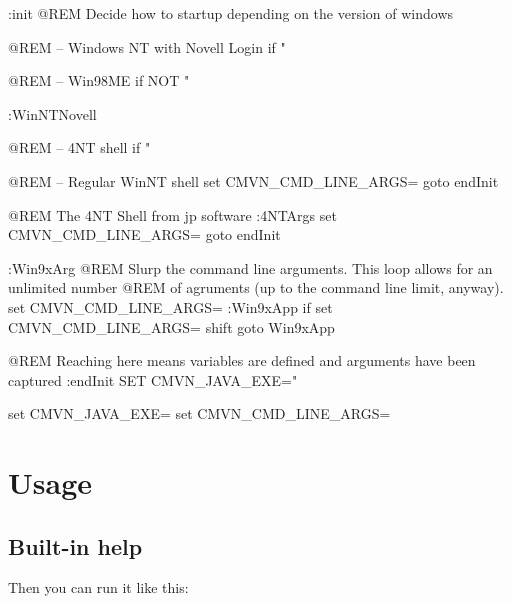 \documentclass[a4paper,11pt,english,oneside,halfparskip]{scrartcl}
\newcommand{\code}[1]{\texttt{#1}}
\begin{document}
\begin{Cmdline}[caption={Windows Command Shell wrapper \code{cmvn.bat}}]
:init
@REM Decide how to startup depending on the version of windows

@REM -- Windows NT with Novell Login
if "%

@REM -- Win98ME
if NOT "%

:WinNTNovell

@REM -- 4NT shell
if "%

@REM -- Regular WinNT shell
set CMVN_CMD_LINE_ARGS=%
goto endInit

@REM The 4NT Shell from jp software
:4NTArgs
set CMVN_CMD_LINE_ARGS=%
goto endInit

:Win9xArg
@REM Slurp the command line arguments.  This loop allows for an unlimited number
@REM of agruments (up to the command line limit, anyway).
set CMVN_CMD_LINE_ARGS=
:Win9xApp
if %
set CMVN_CMD_LINE_ARGS=%
shift
goto Win9xApp

@REM Reaching here means variables are defined and arguments have been captured
:endInit
SET CMVN_JAVA_EXE="%


set CMVN_JAVA_EXE=
set CMVN_CMD_LINE_ARGS=
\end{Cmdline}

\section{Usage}



\subsection{Built-in help}	

Then you can run it like this:

\end{document}

